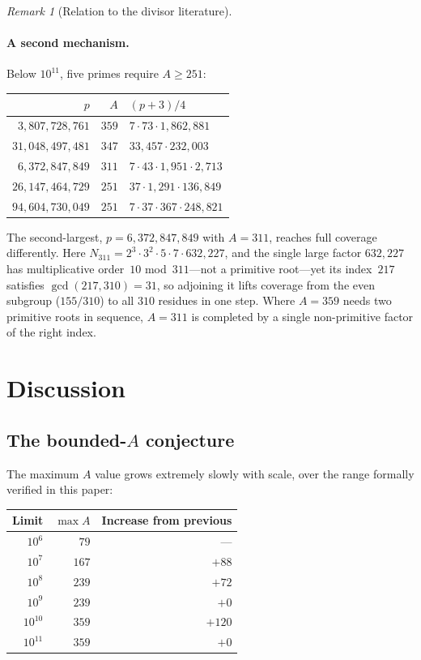 \documentclass[12pt]{amsart}
\theoremstyle{definition}
\theoremstyle{remark}
\newtheorem{remark}[theorem]{Remark}
\begin{document}
\begin{remark}[Relation to the divisor literature]
\paragraph{A second mechanism.}
Below $10^{11}$, five primes require $A \geq 251$:
\begin{center}
\begin{tabular}{@{}rrl@{}}
\toprule
$p$ & $A$ & $(p+3)/4$ \\
\midrule
$3{,}807{,}728{,}761$  & $359$ & $7 \cdot 73 \cdot 1{,}862{,}881$ \\
$31{,}048{,}497{,}481$ & $347$ & $33{,}457 \cdot 232{,}003$ \\
$6{,}372{,}847{,}849$  & $311$ & $7 \cdot 43 \cdot 1{,}951 \cdot 2{,}713$ \\
$26{,}147{,}464{,}729$ & $251$ & $37 \cdot 1{,}291 \cdot 136{,}849$ \\
$94{,}604{,}730{,}049$ & $251$ & $7 \cdot 37 \cdot 367 \cdot 248{,}821$ \\
\bottomrule
\end{tabular}
\end{center}
The second-largest, $p = 6{,}372{,}847{,}849$ with $A = 311$, reaches full
coverage differently. Here $N_{311} = 2^3 \cdot 3^2 \cdot 5 \cdot 7 \cdot
632{,}227$, and the single large factor $632{,}227$ has multiplicative
order~$10$ mod~$311$---not a primitive root---yet its index~$217$ satisfies
$\gcd(217, 310) = 31$, so adjoining it lifts coverage from the even subgroup
($155/310$) to all $310$ residues in one step. Where $A = 359$ needs two
primitive roots in sequence, $A = 311$ is completed by a single non-primitive
factor of the right index.


\section{Discussion}\label{sec:discussion}

\subsection{The bounded-$A$ conjecture}

The maximum $A$ value grows extremely slowly with scale, over the
range formally verified in this paper:

\begin{center}
\begin{tabular}{@{}rrr@{}}
\toprule
Limit & $\max A$ & Increase from previous \\
\midrule
$10^6$ & $79$ & --- \\
$10^7$ & $167$ & $+88$ \\
$10^8$ & $239$ & $+72$ \\
$10^9$ & $239$ & $+0$ \\
$10^{10}$ & $359$ & $+120$ \\
$10^{11}$ & $359$ & $+0$ \\
\bottomrule
\end{tabular}
\end{center}


\end{remark}
\end{document}
